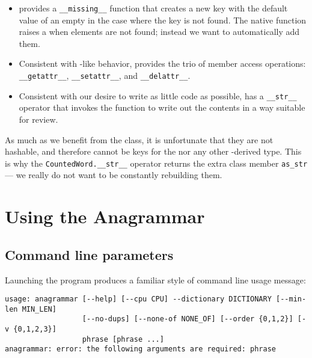\documentclass[letterpaper, 11pt]{article}
\begin{document}
\begin{itemize}
\item {} provides a \verb|__missing__| function that
creates a new key with the default value of an empty  in
the case where the key is not found. The native  function
raises a  when elements are not found; instead we want to
automatically add them.

\item Consistent with -like behavior,  provides
the trio of member access operations: \verb|__getattr__|, \verb|__setattr__|,
and \verb|__delattr__|. 

\item Consistent with our desire to write as little code as possible, 
 has a \verb|__str__| operator that invokes the 
function to write out the contents in a way suitable for review.

\end{itemize}

As much as we benefit from the  class, it is unfortunate
that they are not hashable, and therefore cannot be keys for the 
nor any other -derived type. This is why the \verb|CountedWord.__str__| 
operator returns the extra class member \verb|as_str| --- we really do not want
to be constantly rebuilding them. 

\section{Using the Anagrammar}
\subsection{Command line parameters}

Launching the program produces a familiar style of command line usage 
message:

\small
\begin{verbatim}
usage: anagrammar [--help] [--cpu CPU] --dictionary DICTIONARY [--min-len MIN_LEN]
                  [--no-dups] [--none-of NONE_OF] [--order {0,1,2}] [-v {0,1,2,3}]
                  phrase [phrase ...]
anagrammar: error: the following arguments are required: phrase
\end{verbatim}
\normalsize
\end{document}
